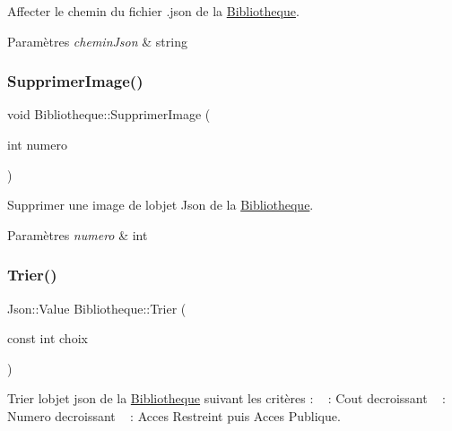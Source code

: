 Affecter le chemin du fichier .json de la \hyperlink{classBibliotheque}{Bibliotheque}. 


\begin{DoxyParams}{Paramètres}
{\em chemin\+Json} & string \\
\hline
\end{DoxyParams}
\mbox{\label{classBibliotheque_a3e4940fd008650236beae91780d7b068}} 
\subsubsection{\texorpdfstring{Supprimer\+Image()}{SupprimerImage()}}
{\footnotesize\ttfamily void Bibliotheque\+::\+Supprimer\+Image (\begin{DoxyParamCaption}\item[{int}]{numero }\end{DoxyParamCaption})}



Supprimer une image de l\textquotesingle{}objet Json de la \hyperlink{classBibliotheque}{Bibliotheque}. 


\begin{DoxyParams}{Paramètres}
{\em numero} & int \\
\hline
\end{DoxyParams}
\mbox{\label{classBibliotheque_aa06803a5d680126cdbddbe4e1ab9395c}} 
\subsubsection{\texorpdfstring{Trier()}{Trier()}\hspace{0.1cm}{\footnotesize\ttfamily [1/4]}}
{\footnotesize\ttfamily Json\+::\+Value Bibliotheque\+::\+Trier (\begin{DoxyParamCaption}\item[{const int}]{choix }\end{DoxyParamCaption})}



Trier l\textquotesingle{}objet json de la \hyperlink{classBibliotheque}{Bibliotheque} suivant les critères \+: ~ \+: Cout decroissant ~ \+: Numero decroissant ~ \+: Acces Restreint puis Acces Publique. 


